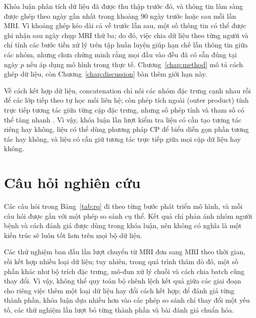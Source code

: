 Khóa luận phân tích dữ liệu đã được thu thập trước đó, và thông tin lâm sàng được ghép theo ngày gần nhất trong khoảng 90 ngày trước hoặc sau mỗi lần MRI. Vì khoảng ghép kéo dài cả về trước lẫn sau, một số thông tin có thể được ghi nhận sau ngày chụp MRI thứ ba; do đó, việc chia dữ liệu theo từng người và chỉ tính các bước tiền xử lý trên tập huấn luyện giúp hạn chế lẫn thông tin giữa các nhóm, nhưng chưa chứng minh rằng mọi đầu vào đều đã có sẵn đúng tại ngày $p$ nếu áp dụng mô hình trong thực tế. Chương~\ref{chap:method} mô tả cách ghép dữ liệu, còn Chương~\ref{chap:discussion} bàn thêm giới hạn này.

Về cách kết hợp dữ liệu, concatenation chỉ nối các nhóm đặc trưng cạnh nhau rồi để các lớp tiếp theo tự học mối liên hệ; còn phép tích ngoài (outer product) tính trực tiếp tương tác giữa từng cặp đặc trưng, nhưng số phép tính và tham số có thể tăng nhanh \cite{zadeh2017tensor}. Vì vậy, khóa luận lần lượt kiểm tra liệu có cần tạo tương tác riêng hay không, liệu có thể dùng phương pháp CP để biểu diễn gọn phần tương tác hay không, và liệu có cần giữ tương tác trực tiếp giữa mọi cặp dữ liệu hay không.

\section{Câu hỏi nghiên cứu}
Các câu hỏi trong Bảng~\ref{tab:rq} đi theo từng bước phát triển mô hình, và mỗi câu hỏi được gắn với một phép so sánh cụ thể. Kết quả chỉ phản ánh nhóm người bệnh và cách đánh giá được dùng trong khóa luận, nên không có nghĩa là một kiến trúc sẽ luôn tốt hơn trên mọi bộ dữ liệu.

Các thử nghiệm ban đầu lần lượt chuyển từ MRI đơn sang MRI theo thời gian, rồi kết hợp nhiều loại dữ liệu; tuy nhiên, trong quá trình thăm dò đó, một số phần khác như bộ trích đặc trưng, mô-đun xử lý chuỗi và cách chia batch cũng thay đổi. Vì vậy, không thể quy toàn bộ chênh lệch kết quả giữa các giai đoạn cho riêng việc thêm một loại dữ liệu hay đổi cách kết hợp; để đánh giá từng thành phần, khóa luận dựa nhiều hơn vào các phép so sánh chỉ thay đổi một yếu tố, các thử nghiệm lần lượt bỏ từng thành phần và bài đánh giá chuẩn hóa.

